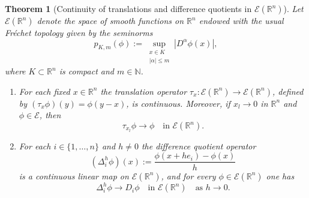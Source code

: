 \documentclass[12pt,a4paper]{article}
\theoremstyle{plain}
\newtheorem{theorem}{Theorem}[section]
\theoremstyle{definition}
\theoremstyle{remark}
\theoremstyle{remark}
\begin{document}
\begin{theorem}[Continuity of translations and difference quotients in $\mathcal{E}(\mathbb{R}^n)$]
	Let $\mathcal{E}(\mathbb{R}^n)$ denote the space of smooth functions
	on $\mathbb{R}^n$ endowed with the usual Fréchet topology given by the
	seminorms
	\[
	p_{K,m}(\phi)
	:= \sup_{\substack{x\in K\\ |\alpha|\le m}}
	|D^\alpha\phi(x)|,
	\]
	where $K\subset\mathbb{R}^n$ is compact and $m\in\mathbb{N}$.
	
	\begin{enumerate}
		\item[(a)] For each fixed $x\in\mathbb{R}^n$ the translation operator
		$\tau_x:\mathcal{E}(\mathbb{R}^n)\to\mathcal{E}(\mathbb{R}^n)$,
		defined by $(\tau_x\phi)(y)=\phi(y-x)$, is continuous.
		Moreover, if $x_l\to 0$ in $\mathbb{R}^n$ and $\phi\in\mathcal{E}$,
		then
		\[
		\tau_{x_l}\phi \longrightarrow \phi
		\quad\text{in }\mathcal{E}(\mathbb{R}^n).
		\]
		
		\item[(b)] For each $i\in\{1,\dots,n\}$ and $h\neq 0$ the difference
		quotient operator
		\[
		(\Delta_i^h\phi)(x)
		:= \frac{\phi(x+he_i)-\phi(x)}{h}
		\]
		is a continuous linear map on $\mathcal{E}(\mathbb{R}^n)$, and
		for every $\phi\in\mathcal{E}(\mathbb{R}^n)$ one has
		\[
		\Delta_i^h\phi \longrightarrow D_i\phi
		\quad\text{in }\mathcal{E}(\mathbb{R}^n)
		\quad\text{as } h\to 0.
		\]
	\end{enumerate}
\end{theorem}
\end{document}
